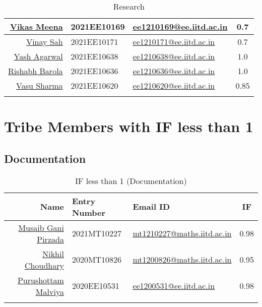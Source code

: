 \begin{center}
\begin{longtable}{| n | e | E | c| }
\hline 
\href{https://github.com/vikas4vikas}{Vikas Meena} & 2021EE10169 & \href{mailto:ee1210169@ee.iitd.ac.in}{ee1210169@ee.iitd.ac.in} & 0.7\\ 
\hline 
\href{nan}{Vinay Sah} & 2021EE10171 & \href{mailto:ee1210171@ee.iitd.ac.in}{ee1210171@ee.iitd.ac.in} & 0.7\\ 
\hline 
\href{https://www.linkedin.com/in/yash089610/}{Yash Agarwal} & 2021EE10638 & \href{mailto:ee1210638@ee.iitd.ac.in}{ee1210638@ee.iitd.ac.in} & 1.0\\ 
\hline 
\href{nan}{Rishabh Barola} & 2021EE10636 & \href{mailto:ee1210636@ee.iitd.ac.in}{ee1210636@ee.iitd.ac.in} & 1.0\\ 
\hline 
\href{https://github.com/crownCTDM}{Vasu Sharma} & 2021EE10620 & \href{mailto:ee1210620@ee.iitd.ac.in}{ee1210620@ee.iitd.ac.in} & 0.85\\ 
\hline 
\hline
		    \caption{Research}
	    \end{longtable}
    \end{center}
\section{Tribe Members with IF less than 1}
    \subsection{Documentation}
    \begin{center}
    \label{Docu2}
    \begin{longtable}{| n | e | E | c| }
        \hline
        \textbf{Name}                                                                                                      & \textbf{Entry Number} & \textbf{Email ID}                                                    & \textbf{IF} \\
        \hline \hline\href{https://github.com/Musaibgani}{Musaib Gani Pirzada} & 2021MT10227 & \href{mailto:mt1210227@maths.iitd.ac.in}{mt1210227@maths.iitd.ac.in} & 0.98\\ 
\hline 
\href{nan}{Nikhil Choudhary} & 2020MT10826 & \href{mailto:mt1200826@maths.iitd.ac.in}{mt1200826@maths.iitd.ac.in} & 0.95\\ 
\hline 
\href{https://www.linkedin.com/in/purushottam-malviya-9225681bb/}{Purushottam Malviya} & 2020EE10531 & \href{mailto:ee1200531@ee.iitd.ac.in}{ee1200531@ee.iitd.ac.in} & 0.98\\ 
\hline 
\hline
		    \caption{IF less than 1 (Documentation)}
	    \end{longtable}
    \end{center}

